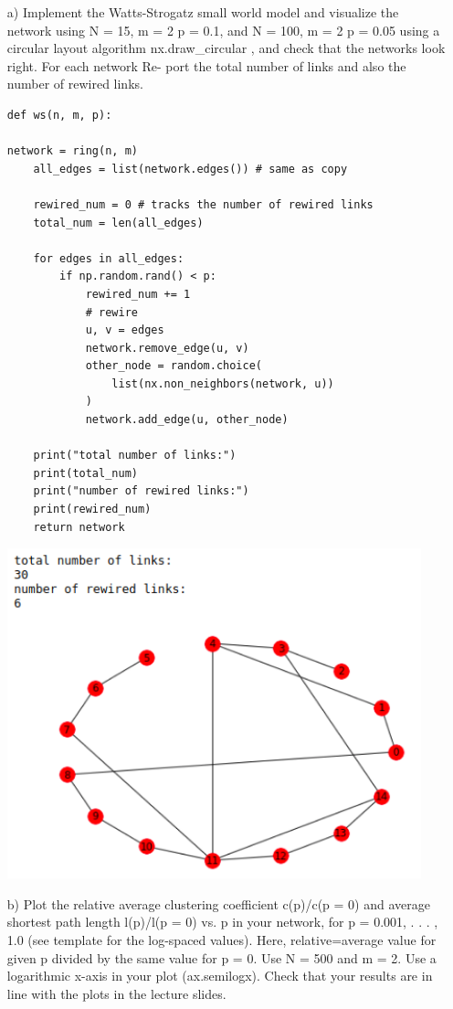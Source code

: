 \documentclass[a4paper,12pt]{article}
\begin{document}
\begin{itemize}
\item[a) ] Implement the Watts-Strogatz small world model and visualize the network
using N = 15, m = 2 p = 0.1, and N = 100, m = 2 p = 0.05 using a circular layout algorithm 
nx.draw\_circular , and check that the networks look right. For each network Re-
port the total number of links and also the number of rewired links.

\begin{lstlisting}
def ws(n, m, p):

network = ring(n, m)
    all_edges = list(network.edges()) # same as copy
    
    rewired_num = 0 # tracks the number of rewired links
    total_num = len(all_edges)
    
    for edges in all_edges:
        if np.random.rand() < p:
            rewired_num += 1
            # rewire
            u, v = edges
            network.remove_edge(u, v)
            other_node = random.choice(
                list(nx.non_neighbors(network, u))
            )
            network.add_edge(u, other_node)
            
    print("total number of links:")
    print(total_num)
    print("number of rewired links:")
    print(rewired_num)
    return network

  \end{lstlisting}
\begin{minipage}{\linewidth}
\centering
\includegraphics[width=12cm]{assets/rewire.png}
\end{minipage}\hfill

\item[b) ] Plot the relative average clustering coefficient c(p)/c(p = 0) and average shortest
path length l(p)/l(p = 0) vs. p in your network, for p = 0.001, . . . , 1.0 (see template for
the log-spaced values). Here, relative=average value for given p divided by the same value
for p = 0. Use N = 500 and m = 2. Use a logarithmic x-axis in your plot (ax.semilogx).
Check that your results are in line with the plots in the lecture slides.


\end{itemize}
\end{document}
